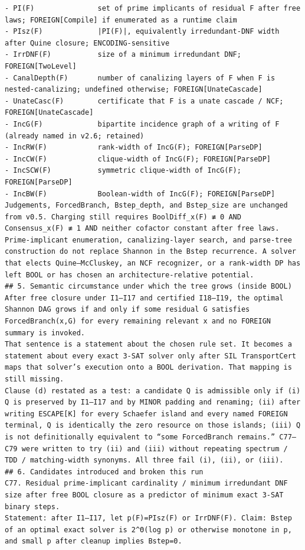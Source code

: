 \documentclass[11pt]{article}
\begin{document}
\begin{Verbatim}[breaklines=true,breakanywhere=true]
- PI(F)               set of prime implicants of residual F after free laws; FOREIGN[Compile] if enumerated as a runtime claim
- PIsz(F)             |PI(F)|, equivalently irredundant-DNF width after Quine closure; ENCODING-sensitive
- IrrDNF(F)           size of a minimum irredundant DNF; FOREIGN[TwoLevel]
- CanalDepth(F)       number of canalizing layers of F when F is nested-canalizing; undefined otherwise; FOREIGN[UnateCascade]
- UnateCasc(F)        certificate that F is a unate cascade / NCF; FOREIGN[UnateCascade]
- IncG(F)             bipartite incidence graph of a writing of F (already named in v2.6; retained)
- IncRW(F)            rank-width of IncG(F); FOREIGN[ParseDP]
- IncCW(F)            clique-width of IncG(F); FOREIGN[ParseDP]
- IncSCW(F)           symmetric clique-width of IncG(F); FOREIGN[ParseDP]
- IncBW(F)            Boolean-width of IncG(F); FOREIGN[ParseDP]
Judgements, ForcedBranch, Bstep_depth, and Bstep_size are unchanged from v0.5. Charging still requires BoolDiff_x(F) ≢ 0 AND Consensus_x(F) ≢ 1 AND neither cofactor constant after free laws.
Prime-implicant enumeration, canalizing-layer search, and parse-tree construction do not replace Shannon in the Bstep recurrence. A solver that elects Quine–McCluskey, an NCF recognizer, or a rank-width DP has left BOOL or has chosen an architecture-relative potential.
## 5. Semantic circumstance under which the tree grows (inside BOOL)
After free closure under I1–I17 and certified I18–I19, the optimal Shannon DAG grows if and only if some residual G satisfies ForcedBranch(x,G) for every remaining relevant x and no FOREIGN summary is invoked.
That sentence is a statement about the chosen rule set. It becomes a statement about every exact 3-SAT solver only after SIL TransportCert maps that solver’s execution onto a BOOL derivation. That mapping is still missing.
Clause (d) restated as a test: a candidate Q is admissible only if (i) Q is preserved by I1–I17 and by MINOR padding and renaming; (ii) after writing ESCAPE[K] for every Schaefer island and every named FOREIGN terminal, Q is identically the zero resource on those islands; (iii) Q is not definitionally equivalent to “some ForcedBranch remains.” C77–C79 were written to try (ii) and (iii) without repeating spectrum / TDD / matching-width synonyms. All three fail (i), (ii), or (iii).
## 6. Candidates introduced and broken this run
C77. Residual prime-implicant cardinality / minimum irredundant DNF size after free BOOL closure as a predictor of minimum exact 3-SAT binary steps.
Statement: after I1–I17, let p(F)=PIsz(F) or IrrDNF(F). Claim: Bstep of an optimal exact solver is 2^Θ(log p) or otherwise monotone in p, and small p after cleanup implies Bstep=0.

\end{Verbatim}
\end{document}
